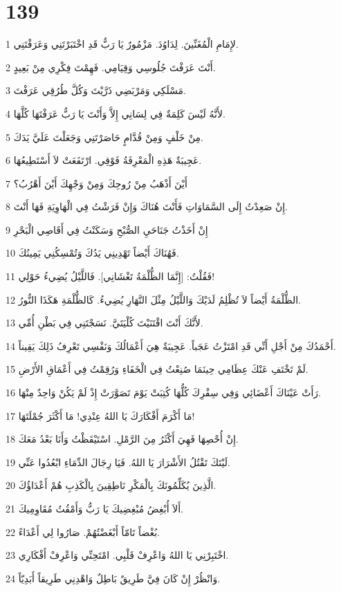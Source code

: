 \chapter{139}

\par 1 لإِمَامِ الْمُغَنِّينَ. لِدَاوُدَ. مَزْمُورٌ يَا رَبُّ قَدِ اخْتَبَرْتَنِي وَعَرَفْتَنِي.
\par 2 أَنْتَ عَرَفْتَ جُلُوسِي وَقِيَامِي. فَهِمْتَ فِكْرِي مِنْ بَعِيدٍ.
\par 3 مَسْلَكِي وَمَرْبَضِي ذَرَّيْتَ وَكُلَّ طُرُقِي عَرَفْتَ.
\par 4 لأَنَّهُ لَيْسَ كَلِمَةٌ فِي لِسَانِي إِلاَّ وَأَنْتَ يَا رَبُّ عَرَفْتَهَا كُلَّهَا.
\par 5 مِنْ خَلْفٍ وَمِنْ قُدَّامٍ حَاصَرْتَنِي وَجَعَلْتَ عَلَيَّ يَدَكَ.
\par 6 عَجِيبَةٌ هَذِهِ الْمَعْرِفَةُ فَوْقِي. ارْتَفَعَتْ لاَ أَسْتَطِيعُهَا.
\par 7 أَيْنَ أَذْهَبُ مِنْ رُوحِكَ وَمِنْ وَجْهِكَ أَيْنَ أَهْرُبُ؟
\par 8 إِنْ صَعِدْتُ إِلَى السَّمَاوَاتِ فَأَنْتَ هُنَاكَ وَإِنْ فَرَشْتُ فِي الْهَاوِيَةِ فَهَا أَنْتَ.
\par 9 إِنْ أَخَذْتُ جَنَاحَيِ الصُّبْحِ وَسَكَنْتُ فِي أَقَاصِي الْبَحْرِ
\par 10 فَهُنَاكَ أَيْضاً تَهْدِينِي يَدُكَ وَتُمْسِكُنِي يَمِينُكَ.
\par 11 فَقُلْتُ: [إِنَّمَا الظُّلْمَةُ تَغْشَانِي]. فَاللَّيْلُ يُضِيءُ حَوْلِي!
\par 12 الظُّلْمَةُ أَيْضاً لاَ تُظْلِمُ لَدَيْكَ وَاللَّيْلُ مِثْلَ النَّهَارِ يُضِيءُ. كَالظُّلْمَةِ هَكَذَا النُّورُ.
\par 13 لأَنَّكَ أَنْتَ اقْتَنَيْتَ كُلْيَتَيَّ. نَسَجْتَنِي فِي بَطْنِ أُمِّي.
\par 14 أَحْمَدُكَ مِنْ أَجْلِ أَنِّي قَدِ امْتَزْتُ عَجَباً. عَجِيبَةٌ هِيَ أَعْمَالُكَ وَنَفْسِي تَعْرِفُ ذَلِكَ يَقِيناً.
\par 15 لَمْ تَخْتَفِ عَنْكَ عِظَامِي حِينَمَا صُنِعْتُ فِي الْخَفَاءِ وَرُقِمْتُ فِي أَعْمَاقِ الأَرْضِ.
\par 16 رَأَتْ عَيْنَاكَ أَعْضَائِي وَفِي سِفْرِكَ كُلُّهَا كُتِبَتْ يَوْمَ تَصَوَّرَتْ إِذْ لَمْ يَكُنْ وَاحِدٌ مِنْهَا.
\par 17 مَا أَكْرَمَ أَفْكَارَكَ يَا اللهُ عِنْدِي! مَا أَكْثَرَ جُمْلَتَهَا!
\par 18 إِنْ أُحْصِهَا فَهِيَ أَكْثَرُ مِنَ الرَّمْلِ. اسْتَيْقَظْتُ وَأَنَا بَعْدُ مَعَكَ.
\par 19 لَيْتَكَ تَقْتُلُ الأَشْرَارَ يَا اللهُ. فَيَا رِجَالَ الدِّمَاءِ ابْعُدُوا عَنِّي.
\par 20 الَّذِينَ يُكَلِّمُونَكَ بِالْمَكْرِ نَاطِقِينَ بِالْكَذِبِ هُمْ أَعْدَاؤُكَ.
\par 21 أَلاَ أُبْغِضُ مُبْغِضِيكَ يَا رَبُّ وَأَمْقُتُ مُقَاوِمِيكَ.
\par 22 بُغْضاً تَامّاً أَبْغَضْتُهُمْ. صَارُوا لِي أَعْدَاءً.
\par 23 اخْتَبِرْنِي يَا اللهُ وَاعْرِفْ قَلْبِي. امْتَحِنِّي وَاعْرِفْ أَفْكَارِي.
\par 24 وَانْظُرْ إِنْ كَانَ فِيَّ طَرِيقٌ بَاطِلٌ وَاهْدِنِي طَرِيقاً أَبَدِيّاً.


